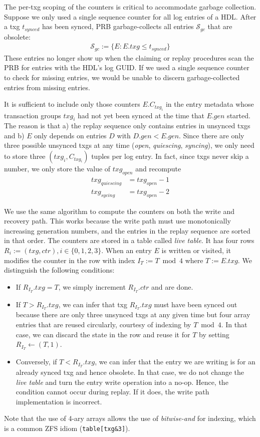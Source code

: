 \documentclass[12pt,a4paper,twoside]{book}
\begin{document}
The per-txg scoping of the counters is critical to accommodate garbage collection.
Suppose we only used a single sequence counter for all log entries of a HDL.
After a txg $t_{synced}$ has been synced, PRB garbage-collects all entries $\mathcal{S}_{gc}$ that are obsolete:
\begin{align*}
    \mathcal{S}_{gc} := \{ E : E.txg \le t_{synced}\}
\end{align*}
These entries no longer show up when the claiming or replay procedures scan the PRB for entries with the HDL's log GUID.
If we used a single sequence counter to check for missing entries, we would be unable to discern garbage-collected entries from missing entries.

It is sufficient to include only those counters $E.C_{txg_i}$ in the entry metadata whose transaction groups $txg_i$ had not yet been synced at the time that $E.gen$ started.
The reason is that a) the replay sequence only contains entries in unsynced txgs and b) $E$ only depends on entries $D$ with $D.gen < E.gen$.
Since there are only three possible unsynced txgs at any time (\textit{open}, \textit{quiescing}, \textit{syncing}), we only need to store three $(txg_i, C_{txg_i})$ tuples per log entry.
In fact, since txgs never skip a number, we only store the value of $txg_{open}$ and recompute
\begin{align*}
    txg_{quiescing} & = txg_{open} - 1 \\
    txg_{sycing} & = txg_{open} - 2
\end{align*}

We use the same algorithm to compute the counters on both the write and recovery path.
This works because the write path must use monotonically increasing generation numbers, and the entries in the replay sequence are sorted in that order.
The counters are stored in a table called \textit{live table}.
It has four rows $R_i := (txg, ctr), i \in \{0,1,2,3\}$.
When an entry $E$ is written or visited, it modifies the counter in the row with index $I_T := T \bmod 4$ where $T := E.txg$.
We distinguish the following conditions:
\begin{itemize}[noitemsep]
\item If $R_{I_T}.txg = T$, we simply increment $R_{I_T}.ctr$ and are done.
\item If $T > R_{I_T}.txg$, we can infer that txg $R_{I_T}.txg$ must have been synced out because there are only three unsynced txgs at any given time but four array entries that are reused circularly, courtesy of indexing by $T \bmod 4$.
In that case, we can discard the state in the row and reuse it for $T$ by setting $R_{I_T} \leftarrow (T, 1)$.
\item Conversely, if $T < R_{I_T}.txg$, we can infer that the entry we are writing is for an already synced txg and hence obsolete.
In that case, we do not change the \textit{live table} and turn the entry write operation into a no-op.
Hence, the condition cannot occur during replay. If it does, the write path implementation is incorrect.
\end{itemize}
Note that the use of 4-ary arrays allows the use of \textit{bitwise-and} for indexing, which is a common ZFS idiom (\lstinline{table[txg&3]}).
\end{document}
